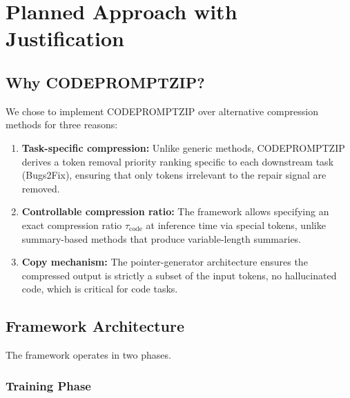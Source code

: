 \documentclass[11pt,a4paper]{article}
\begin{document}
\section{Planned Approach with Justification}

\subsection{Why CODEPROMPTZIP?}

We chose to implement CODEPROMPTZIP over alternative compression methods for three reasons:

\begin{enumerate}[leftmargin=1.5em]
  \item \textbf{Task-specific compression:} Unlike generic methods, CODEPROMPTZIP derives a token removal priority ranking specific to each downstream task (Bugs2Fix), ensuring that only tokens irrelevant to the repair signal are removed.
  \item \textbf{Controllable compression ratio:} The framework allows specifying an exact compression ratio $\tau_{\text{code}}$ at inference time via special tokens, unlike summary-based methods that produce variable-length summaries.
  \item \textbf{Copy mechanism:} The pointer-generator architecture ensures the compressed output is strictly a subset of the input tokens, no hallucinated code, which is critical for code tasks.
\end{enumerate}

\subsection{Framework Architecture}

The framework operates in two phases.

\subsubsection*{Training Phase}
\end{document}
